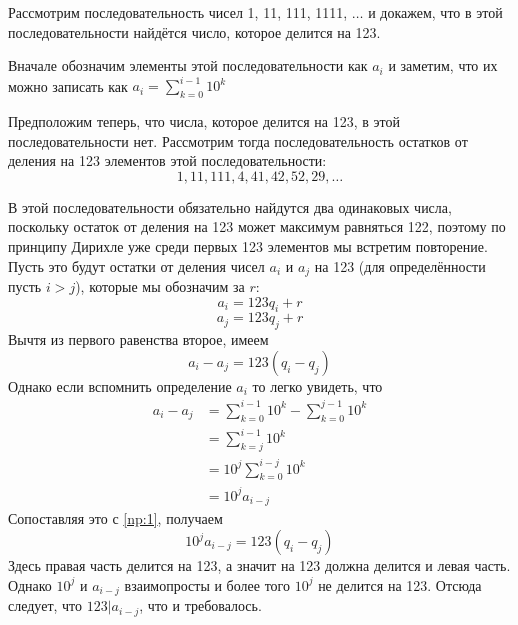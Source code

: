 \begin{example}
Рассмотрим последовательность чисел 1, 11, 111, 1111, $\ldots$ и докажем, что в этой последовательности найдётся число, которое делится на 123.

Вначале обозначим элементы этой последовательности как $a_i$ и заметим, что их можно записать как
$a_i = \sum_{k=0}^{i-1}10^k$

Предположим теперь, что числа, которое делится на 123, в этой последовательности нет. Рассмотрим тогда последовательность остатков от деления на 123 элементов этой последовательности:
$$1, 11, 111, 4, 41, 42, 52, 29, \ldots$$

В этой последовательности обязательно найдутся два одинаковых числа, поскольку остаток от деления на 123 может максимум равняться 122, поэтому по принципу Дирихле уже среди первых 123 элементов мы встретим повторение. Пусть это будут остатки от деления чисел $a_i$ и $a_j$ на 123 (для определённости пусть $i>j$), которые мы обозначим за $r$:
$$a_i = 123q_i + r$$
$$a_j = 123q_j + r$$
Вычтя из первого равенства второе, имеем
\begin{equation}\label{np:1}
a_i - a_j = 123(q_i - q_j)
\end{equation}
Однако если вспомнить определение $a_i$ то легко увидеть, что
\begin{align*}
a_i - a_j &= \sum_{k=0}^{i-1}10^k - \sum_{k=0}^{j-1}10^k \\&= \sum_{k=j}^{i-1}10^k \\&= 10^j\sum_{k=0}^{i-j}10^k \\&= 10^j a_{i-j}
\end{align*}
Сопоставляя это с \eqref{np:1}, получаем
$$10^j a_{i-j} = 123(q_i - q_j)$$
Здесь правая часть делится на 123, а значит на 123 должна делится и левая часть. Однако $10^j$ и $a_{i-j}$ взаимопросты и более того $10^j$ не делится на 123. Отсюда следует, что $123|a_{i-j}$, что и требовалось.
\end{example}


